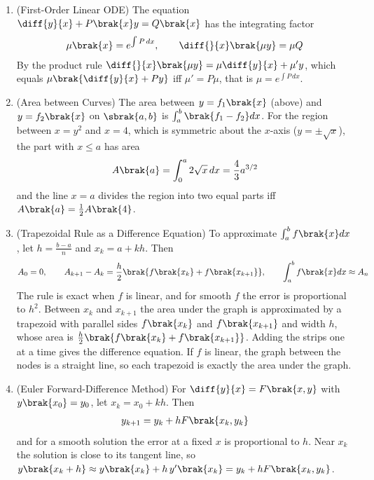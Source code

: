 \begin{enumerate}[label=\thesubsection.\arabic*, ref=\thesubsection.\theenumi,itemsep=1.5em]
\item (First-Order Linear ODE) The equation $\diff{y}{x}+P\brak{x}y=Q\brak{x}$ has the integrating factor
\begin{align}
\mu\brak{x} = e^{\int P\,dx}, \qquad \diff{}{x}\brak{\mu y} = \mu Q
\label{eq:EE26BTECH11218-cb12-linode}
\end{align}
\solution By the product rule $\diff{}{x}\brak{\mu y} = \mu\diff{y}{x}+\mu'y$, which equals $\mu\brak{\diff{y}{x}+Py}$ iff $\mu'=P\mu$, that is $\mu=e^{\int P\,dx}$.

\item (Area between Curves) The area between $y=f_1\brak{x}$ (above) and $y=f_2\brak{x}$ on $\sbrak{a,b}$ is $\int_a^b\brak{f_1-f_2}dx$. For the region between $x=y^2$ and $x=4$, which is symmetric about the $x$-axis ($y=\pm\sqrt{x}$), the part with $x\le a$ has area
\begin{align}
A\brak{a} = \int_0^a2\sqrt{x}\,dx = \frac{4}{3}a^{3/2}
\label{eq:EE26BTECH11218-cb12-area}
\end{align}
and the line $x=a$ divides the region into two equal parts iff $A\brak{a}=\frac{1}{2}A\brak{4}$.

\item (Trapezoidal Rule as a Difference Equation) To approximate $\int_a^bf\brak{x}dx$, let $h=\frac{b-a}{n}$ and $x_k=a+kh$. Then
\begin{align}
A_0=0, \qquad A_{k+1}-A_k = \frac{h}{2}\brak{f\brak{x_k}+f\brak{x_{k+1}}}, \qquad \int_a^bf\brak{x}dx \approx A_n
\label{eq:EE26BTECH11218-cb12-trap}
\end{align}
The rule is exact when $f$ is linear, and for smooth $f$ the error is proportional to $h^2$.
\solution Between $x_k$ and $x_{k+1}$ the area under the graph is approximated by a trapezoid with parallel sides $f\brak{x_k}$ and $f\brak{x_{k+1}}$ and width $h$, whose area is $\frac{h}{2}\brak{f\brak{x_k}+f\brak{x_{k+1}}}$. Adding the strips one at a time gives the difference equation. If $f$ is linear, the graph between the nodes is a straight line, so each trapezoid is exactly the area under the graph.

\item (Euler Forward-Difference Method) For $\diff{y}{x}=F\brak{x,y}$ with $y\brak{x_0}=y_0$, let $x_k=x_0+kh$. Then
\begin{align}
y_{k+1} = y_k+hF\brak{x_k,y_k}
\label{eq:EE26BTECH11218-cb12-euler}
\end{align}
and for a smooth solution the error at a fixed $x$ is proportional to $h$.
\solution Near $x_k$ the solution is close to its tangent line, so $y\brak{x_k+h}\approx y\brak{x_k}+h\,y'\brak{x_k}=y_k+hF\brak{x_k,y_k}$.
\end{enumerate}
